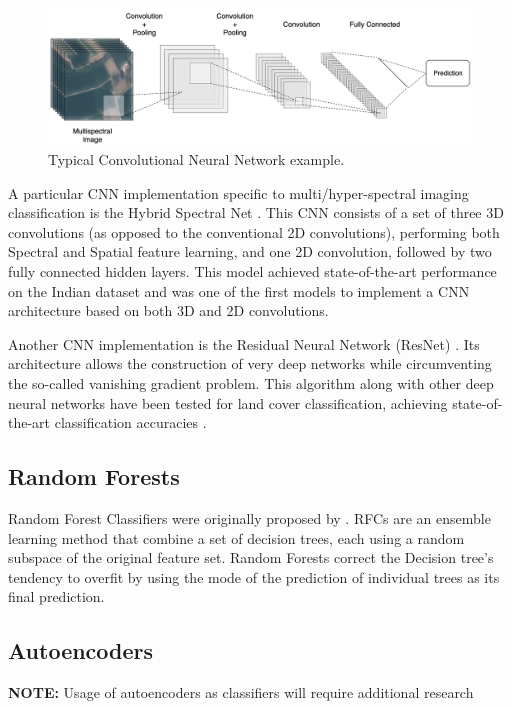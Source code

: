 \documentclass[12pt, english, openany]{book}
\begin{document}
\begin{figure}[H]
	\centering
	\includegraphics[width=1\linewidth]{cnn_example.png}
  \caption{Typical Convolutional Neural Network example.}
  \label{fig:cnn-example}
\end{figure}

A particular CNN implementation specific to multi/hyper-spectral imaging
classification is the Hybrid Spectral Net \cite{Roy2019}. This CNN consists of
a set of three 3D convolutions (as opposed to the conventional 2D
convolutions), performing both Spectral and Spatial feature learning, and one 2D
convolution, followed by two fully connected hidden layers. This model achieved
state-of-the-art performance on the Indian dataset and was one of the first
models to implement a CNN architecture based on both 3D and 2D convolutions.

Another CNN implementation is the Residual Neural Network (ResNet)
\cite{He2016}. Its architecture allows the construction of very deep networks
while circumventing the so-called vanishing gradient problem. This algorithm
along with other deep neural networks have been tested for land cover
classification, achieving state-of-the-art classification accuracies
\cite{Mahdianpari2018}.

\subsection*{Random Forests}

Random Forest Classifiers were originally proposed by \cite{Ho1995}. RFCs are
an ensemble learning method that combine a set of decision trees, each using a
random subspace of the original feature set. Random Forests correct the
Decision tree's tendency to overfit by using the mode of the prediction of
individual trees as its final prediction.

\subsection*{Autoencoders}
\textbf{NOTE:} Usage of autoencoders as classifiers will require additional
research
\end{document}
